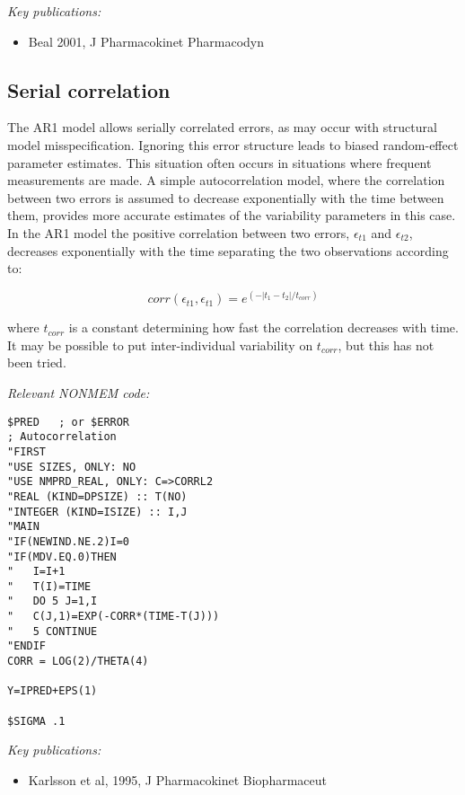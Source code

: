 \documentclass[a4paper,11pt]{article}
\begin{document}
\noindent \emph{Key publications:}
\begin{itemize}
\item Beal 2001, J Pharmacokinet Pharmacodyn
\end{itemize}

\subsection{Serial correlation}
The AR1 model allows serially correlated errors, as may occur with
structural model misspecification. Ignoring this error structure leads
to biased random-effect parameter estimates. This situation often
occurs in situations where frequent measurements are made. A simple
autocorrelation model, where the correlation between two errors is
assumed to decrease exponentially with the time between them, provides
more accurate estimates of the variability parameters in this case. In
the AR1 model the positive correlation between two errors,
$\epsilon_{t1}$ and $\epsilon_{t2}$, decreases exponentially with the
time separating the two observations according to:

\begin{equation}
corr(\epsilon_{t1}, \epsilon_{t1}) = e^{(- \left| t_1 - t_2
\right|/t_{corr})}
\end{equation}

\noindent where $t_{corr}$ is a constant determining how fast the
correlation decreases with time. It may be possible to put
inter-individual variability on $t_{corr}$, but this has not been
tried.

\vspace{10pt}

\noindent \emph{Relevant NONMEM code:}
\begin{lstlisting}
$PRED   ; or $ERROR
; Autocorrelation
"FIRST
"USE SIZES, ONLY: NO
"USE NMPRD_REAL, ONLY: C=>CORRL2
"REAL (KIND=DPSIZE) :: T(NO)
"INTEGER (KIND=ISIZE) :: I,J
"MAIN
"IF(NEWIND.NE.2)I=0
"IF(MDV.EQ.0)THEN
"   I=I+1
"   T(I)=TIME
"   DO 5 J=1,I
"   C(J,1)=EXP(-CORR*(TIME-T(J)))
"   5 CONTINUE
"ENDIF
CORR = LOG(2)/THETA(4)

Y=IPRED+EPS(1)

$SIGMA .1
\end{lstlisting}


\noindent \emph{Key publications:}
\begin{itemize}
\item Karlsson et al, 1995, J Pharmacokinet Biopharmaceut
\end{itemize}
	
\end{document}
